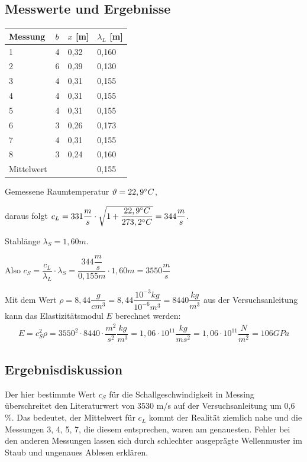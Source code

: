 \documentclass{scrartcl}
\begin{document}
\subsection{Messwerte und Ergebnisse}
\begin{table}[h]
\begin{tabular}{l|l|l|l}
Messung & $b$ & $x$ [m] & $\lambda_{L}$ [m]      \\
\hline
1       & 4            & 0,32    & 0,160 \\
2       & 6            & 0,39    & 0,130 \\
3       & 4            & 0,31    & 0,155 \\
4       & 4            & 0,31    & 0,155 \\
5       & 4            & 0,31    & 0,155 \\
6       & 3            & 0,26    & 0,173 \\
7       & 4            & 0,31    & 0,155 \\
8       & 3            & 0,24    & 0,160 \\
\hline
Mittelwert & & & 0,155
\end{tabular}
\end{table}
Gemessene Raumtemperatur $\vartheta = 22,9\degree C$,

daraus folgt $c_{L} = 331 \dfrac{m}{s} \cdot \sqrt{1+\dfrac{22,9\degree C}{273,2 \degree C}} = 344 \dfrac{m}{s}$.

Stablänge $\lambda_{S} = 1,60m$.

Also $c_{S} = \dfrac{c_{L}}{\lambda_{L}} \cdot \lambda_{S} = \dfrac{344\dfrac{m}{s}}{0,155m} \cdot 1,60m = 3550 \dfrac{m}{s}$

Mit dem Wert $\rho = 8,44 \dfrac{g}{cm^3} = 8,44 \dfrac{10^{-3} kg}{10^{-6} m^3} = 8440 \dfrac{kg}{m^3}$ aus der Versuchsanleitung \\ kann das Elastizitätsmodul $E$ berechnet werden:
\begin{align*}
E = c_{S}^2 \rho = 3550^2 \cdot 8440 \cdot \dfrac{m^2}{s^2} \dfrac{kg}{m^3} = 1,06 \cdot 10^{11} \dfrac{kg}{ms^2} = 1,06 \cdot 10^{11} \dfrac{N}{m^2} = 106 GPa
\end{align*}

\subsection{Ergebnisdiskussion}
Der hier bestimmte Wert $c_{S}$ für die Schallgeschwindigkeit in Messing überschreitet den Literaturwert  von 3530 m/s auf der Versuchsanleitung um 0,6 \%. Das bedeutet, der Mittelwert für $c_{L}$ kommt der Realität ziemlich nahe und die Messungen 3, 4, 5, 7, die diesem entsprechen, waren am genauesten. Fehler bei den anderen Messungen lassen sich durch schlechter ausgeprägte Wellenmuster im Staub und ungenaues Ablesen erklären. 
\end{document}
